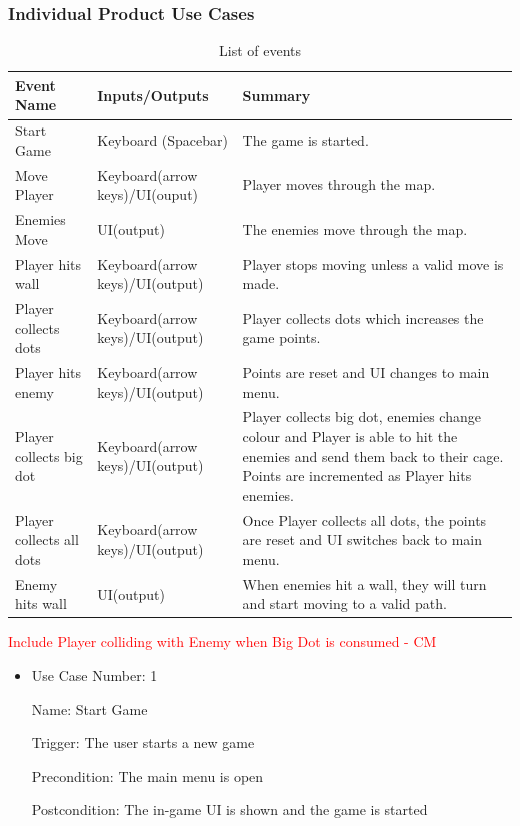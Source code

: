 \documentclass[12pt, titlepage]{article}
\begin{document}
\subsubsection{Individual Product Use Cases}

\begin{table}[H]
\caption{List of events} \label{tab:events}
\begin{tabularx}{\textwidth}{| p{3cm} | p{4cm} | X |}
\toprule {\bf Event Name} & {\bf Inputs/Outputs} & {\bf Summary}\\
\midrule
Start Game & Keyboard (Spacebar) & The game is started.\\ \hline
Move Player & Keyboard(arrow keys)/UI(ouput) & Player moves through the map.\\ \hline
Enemies Move & UI(output) & The enemies move through the map.\\ \hline
Player hits wall & Keyboard(arrow keys)/UI(output) & Player stops moving unless a valid move is made.\\ \hline
Player collects dots & Keyboard(arrow keys)/UI(output) & Player collects dots which increases the game points.\\ \hline
Player hits enemy & Keyboard(arrow keys)/UI(output) & Points are reset and UI changes to main menu.\\ \hline
Player collects big dot & Keyboard(arrow keys)/UI(output) & Player collects big dot, enemies change colour and Player is able to hit the enemies and send them back to their cage. Points are incremented as Player hits enemies.\\ \hline
Player collects all dots & Keyboard(arrow keys)/UI(output) & Once Player collects all dots, the points are reset and UI switches back to main menu.\\ \hline
Enemy hits wall & UI(output) & When enemies hit a wall, they will turn and start moving to a valid path.\\
\bottomrule
\end{tabularx}
\end{table}
\textcolor{red}{ Include Player colliding with Enemy when Big Dot is consumed - CM} \\
\begin{itemize}
\item
Use Case Number: 1

Name: Start Game

Trigger: The user starts a new game

Precondition: The main menu is open

Postcondition: The in-game UI is shown and the game is started

\end{itemize}
\end{document}

